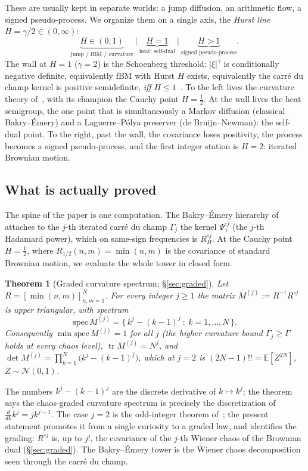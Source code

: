 \documentclass[11pt,reqno]{amsart}
\theoremstyle{plain}
\newtheorem{theorem}{Theorem}[section]
\theoremstyle{definition}
\theoremstyle{remark}
\newcommand{\E}{\mathbb E}
\newcommand{\Had}{\circ}
\DeclareMathOperator{\tr}{tr}
\begin{document}
These are usually kept in separate worlds: a jump diffusion, an
arithmetic flow, a signed pseudo-process. We organize them on a single
axis, the \emph{Hurst line} $H=\gamma/2\in(0,\infty)$:
\[
\underbrace{H\in(0,1)}_{\text{jump / fBM / curvature}}
\ \Big|\
\underbrace{H=1}_{\text{heat: self-dual}}
\ \Big|\
\underbrace{H>1}_{\text{signed pseudo-process}} .
\]
The wall at $H=1$ ($\gamma=2$) is the Schoenberg threshold: $|\xi|^\gamma$
is conditionally negative definite, equivalently fBM with Hurst $H$
exists, equivalently the carr\'e du champ kernel is positive
semidefinite, \emph{iff} $H\le 1$~\cite{Schoenberg}. To the left lives
the curvature theory of~\cite{FontesBE}, with its champion the Cauchy
point $H=\tfrac12$. At the wall lives the heat semigroup, the one point
that is simultaneously a Markov diffusion (classical Bakry--\'Emery)
and a Laguerre--P\'olya preserver (de Bruijn--Newman): the self-dual
point. To the right, past the wall, the covariance loses positivity,
the process becomes a signed pseudo-process, and the first integer
station is $H=2$: iterated Brownian motion.

\subsection{What is actually proved}
The spine of the paper is one computation. The Bakry--\'Emery hierarchy
of~\cite{FontesBE} attaches to the $j$-th iterated carr\'e du champ
$\Gamma_j$ the kernel $\Psi_\gamma^{\Had j}$ (the $j$-th Hadamard
power), which on same-sign frequencies is $R_H^{\Had j}$. At the
Cauchy point $H=\tfrac12$, where $R_{1/2}(n,m)=\min(n,m)$ is the
covariance of standard Brownian motion, we evaluate the whole tower in
closed form.

\begin{theorem}[Graded curvature spectrum; \S\ref{sec:graded}]
\label{thm:intro-graded}
Let $R=[\min(n,m)]_{n,m=1}^N$. For every integer $j\ge1$ the matrix
$M^{(j)}:=R^{-1}R^{\Had j}$ is upper triangular, with spectrum
\[
   \mathrm{spec}\,M^{(j)}=\bigl\{\,k^{j}-(k-1)^{j}\ :\ k=1,\dots,N\,\bigr\}.
\]
Consequently $\min\mathrm{spec}\,M^{(j)}=1$ for all $j$ (the higher
curvature bound $\Gamma_j\ge\Gamma$ holds at every chaos level),
$\tr M^{(j)}=N^{j}$, and $\det M^{(j)}=\prod_{k=1}^N\bigl(k^j-(k-1)^j\bigr)$,
which at $j=2$ is $(2N-1)!!=\E[Z^{2N}]$, $Z\sim\mathcal N(0,1)$.
\end{theorem}

The numbers $k^j-(k-1)^j$ are the discrete derivative of $k\mapsto k^j$;
the theorem says the chaos-graded curvature spectrum is precisely the
discretization of $\tfrac{d}{dk}k^{j}=jk^{j-1}$. The case $j=2$ is the
odd-integer theorem of~\cite{FontesBE}; the present statement promotes
it from a single curiosity to a graded law, and identifies the grading:
$R^{\Had j}$ is, up to $j!$, the covariance of the $j$-th Wiener chaos
of the Brownian dual (\S\ref{sec:graded}). The Bakry--\'Emery tower is
the Wiener chaos decomposition seen through the carr\'e du champ.
\end{document}
